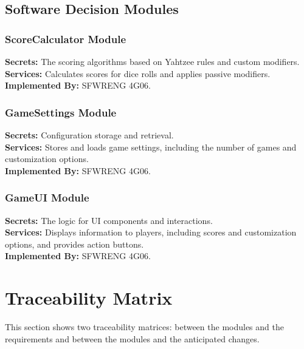 \documentclass[12pt, titlepage]{article}
\begin{document}
\subsection{Software Decision Modules}
\subsubsection{ScoreCalculator Module}
\textbf{Secrets:} The scoring algorithms based on Yahtzee rules and custom modifiers.\\
\textbf{Services:} Calculates scores for dice rolls and applies passive modifiers.\\
\textbf{Implemented By:} SFWRENG 4G06.

\subsubsection{GameSettings Module}
\textbf{Secrets:} Configuration storage and retrieval.\\
\textbf{Services:} Stores and loads game settings, including the number of games and customization options.\\
\textbf{Implemented By:} SFWRENG 4G06.

\subsubsection{GameUI Module}
\textbf{Secrets:} The logic for UI components and interactions.\\
\textbf{Services:} Displays information to players, including scores and customization options, and provides action buttons.\\
\textbf{Implemented By:} SFWRENG 4G06.


\section{Traceability Matrix} \label{SecTM}

This section shows two traceability matrices: between the modules and the
requirements and between the modules and the anticipated changes.
\end{document}
